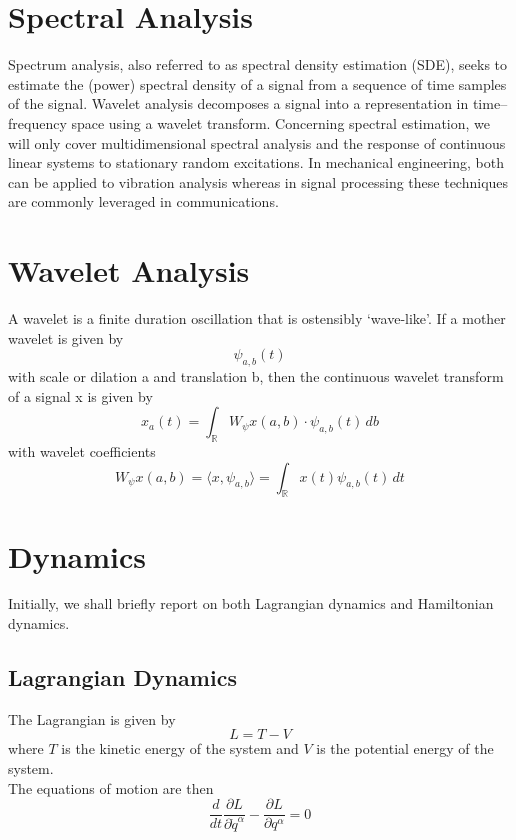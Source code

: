 \documentclass[11pt]{report}
\begin{document}
\tableofcontents

\chapter{Spectral Analysis}

Spectrum analysis, also referred to as spectral density estimation (SDE), seeks to estimate the (power) spectral density of a signal from a sequence of time samples of the signal. Wavelet analysis decomposes a signal into a representation in time–frequency space using a wavelet transform. Concerning spectral estimation, we will only cover multidimensional spectral analysis and the response of continuous linear systems to stationary random excitations. In mechanical engineering, both can be applied to vibration analysis whereas in signal processing these techniques are commonly leveraged in communications.

\chapter{Wavelet Analysis}

A wavelet is a finite duration oscillation that is ostensibly ‘wave-like’. If a mother wavelet is given by
\begin{equation}
	\psi_{a,b}(t)
\end{equation}
with scale or dilation a and translation b, then the continuous wavelet transform of a signal x is given by
\begin{equation}
	x_a(t)=\int_\mathbb{R}{W_\psi{x}(a,b)\cdot\psi_{a,b}(t)\,db}
\end{equation}
with wavelet coefficients
\begin{equation}
	W_\psi{x}(a,b)=\langle{x,\psi_{a,b}}\rangle=\int_\mathbb{R}{x(t)\psi_{a,b}(t)\,dt}
\end{equation}

\chapter{Dynamics}

Initially, we shall briefly report on both Lagrangian dynamics and Hamiltonian dynamics.


\section{Lagrangian Dynamics}

The Lagrangian is given by
\begin{equation}
	L=T-V
\end{equation}
where $T$ is the kinetic energy of the system and $V$ is the potential energy of the system.\\
The equations of motion are then
\begin{equation}
	\frac{d}{dt}\frac{\partial L}{\partial\dot{q}^\alpha}-\frac{\partial L}{\partial q^\alpha}=0
\end{equation}
\end{document}

